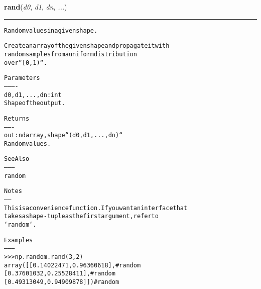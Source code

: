     \vspace{0.5ex}

\hspace{.8\funcindent}\begin{boxedminipage}{\funcwidth}

    \raggedright \textbf{rand}(\textit{d0}, \textit{d1}, \textit{dn}, \textit{...})

    \vspace{-1.5ex}

    \rule{\textwidth}{0.5\fboxrule}
\setlength{\parskip}{2ex}
\begin{alltt}
Random values in a given shape.

Create an array of the given shape and propagate it with
random samples from a uniform distribution
over ``[0, 1)``.

Parameters
----------
d0, d1, ..., dn : int
    Shape of the output.

Returns
-------
out : ndarray, shape ``(d0, d1, ..., dn)``
    Random values.

See Also
--------
random

Notes
-----
This is a convenience function. If you want an interface that
takes a shape-tuple as the first argument, refer to
`random`.

Examples
--------
{\textgreater}{\textgreater}{\textgreater} np.random.rand(3,2)
array([[ 0.14022471,  0.96360618],  \#random
       [ 0.37601032,  0.25528411],  \#random
       [ 0.49313049,  0.94909878]]) \#random
\end{alltt}

\setlength{\parskip}{1ex}
    \end{boxedminipage}

    \label{QSTK:qstklearn:mldiagnostics:randint}

    \vspace{0.5ex}

